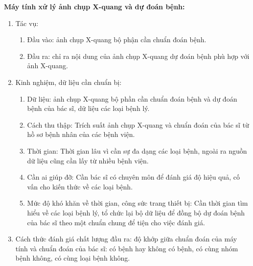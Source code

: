 \documentclass[12pt,letterpaper]{article}
\begin{document}
\textbf{Máy tính xử lý ảnh chụp X-quang và dự đoán bệnh:}
\begin{enumerate}
    \item Tác vụ: 
    \begin{enumerate}
        \item Đầu vào: ảnh chụp X-quang bộ phận cần chuẩn đoán bệnh.
        \item Đầu ra: chỉ ra nội dung của ảnh chụp X-quang dự đoán bệnh phù hợp với ảnh X-quang.
    \end{enumerate}
    \item Kinh nghiệm, dữ liệu cần chuẩn bị:
    \begin{enumerate}
        \item Dữ liệu: ảnh chụp X-quang bộ phần cần chuẩn đoán bệnh và dự đoán bệnh của bác sĩ, dữ liệu các loại bệnh lý. 
        \item Cách thu thập: Trích suất ảnh chụp X-quang và chuẩn đoán của bác sĩ từ hồ sơ bệnh nhân của các bệnh viện.
        \item Thời gian: Thời gian lâu vì cần sự đa dạng các loại bệnh, ngoài ra nguồn dữ liệu cũng cần lấy từ nhiều bệnh viện. 
        \item Cần ai giúp đỡ: Cần bác sĩ có chuyên môn để đánh giá độ hiệu quả, cố vấn cho kiến thức về các loại bệnh.
        \item Mức độ khó khăn về thời gian, công sức trang thiết bị: Cần thời gian tìm hiểu về các loại bệnh lý, tổ chức lại bộ dữ liệu để đồng bộ dự đoán bệnh của bác sĩ theo một chuẩn chung để tiện cho việc đánh giá.
    \end{enumerate}
    \item Cách thức đánh giá chất lượng đầu ra: độ khớp giữa chuẩn đoán của máy tính và chuẩn đoán của bác sĩ: có bệnh hay không có bệnh, có cùng nhóm bệnh không, có cùng loại bệnh không.
\end{enumerate}
\end{document}
